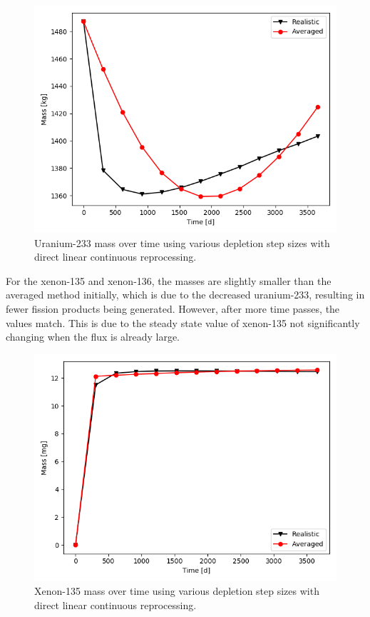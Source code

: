 \begin{figure}[H]
  \centering
  \includegraphics[scale=0.7]{images/adv-U233.png}
  \caption{Uranium-233 mass over time using various depletion step sizes with direct linear continuous reprocessing.}
   \label{fig:DL-cont-u-adv}
\end{figure}

For the xenon-135 and xenon-136, the masses are slightly smaller than the averaged method initially, which is due to the decreased uranium-233, resulting in fewer fission products being generated. However, after more time passes, the values match. This is due to the steady state value of xenon-135 not significantly changing when the flux is already large.

\begin{figure}[H]
  \centering
  \includegraphics[scale=0.7]{images/adv-Xe135.png}
  \caption{Xenon-135 mass over time using various depletion step sizes with direct linear continuous reprocessing.}
   \label{fig:DL-cont-xe135-adv}
\end{figure}

